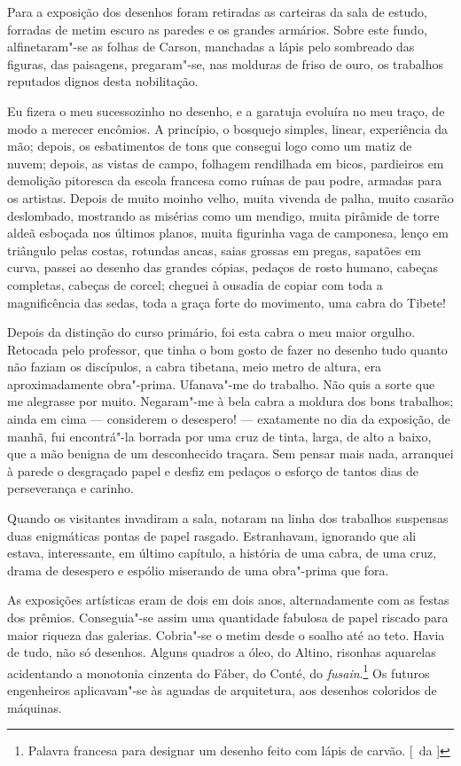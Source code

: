 Para a exposição dos desenhos foram retiradas as carteiras da sala de
estudo, forradas de metim escuro as paredes e os grandes armários.
Sobre este fundo, alfinetaram"-se as folhas de Carson, manchadas a
lápis pelo sombreado das figuras, das paisagens, pregaram"-se, nas
molduras de friso de ouro, os trabalhos reputados dignos desta
nobilitação. 

Eu fizera o meu sucessozinho no desenho, e a garatuja
evoluíra no meu traço, de modo a merecer encômios. A princípio, o
bosquejo simples, linear, experiência da mão; depois, os esbatimentos
de tons que consegui logo como um matiz de nuvem; depois, as vistas de
campo, folhagem rendilhada em bicos, pardieiros em demolição pitoresca
da escola francesa como ruínas de pau podre, armadas
para os artistas. Depois de muito moinho velho, muita vivenda de palha,
muito casarão deslombado, mostrando as misérias como um mendigo, muita
pirâmide de torre aldeã esboçada nos últimos planos, muita figurinha
vaga de camponesa, lenço em triângulo pelas costas, rotundas ancas,
saias grossas em pregas, sapatões em curva, passei ao desenho das
grandes cópias, pedaços de rosto humano, cabeças completas, cabeças de
corcel; cheguei à ousadia de copiar com toda a magnificência das sedas,
toda a graça forte do movimento, uma cabra do Tibete! 

Depois da distinção do curso primário, foi esta cabra o meu maior orgulho.
Retocada pelo professor, que tinha o bom gosto de fazer no desenho tudo
quanto não faziam os discípulos, a cabra tibetana, meio metro de
altura, era aproximadamente obra"-prima. Ufanava"-me do trabalho. Não
quis a sorte que me alegrasse por muito. Negaram"-me à bela cabra a
moldura dos bons trabalhos; ainda em cima --- considerem o desespero!
--- exatamente no dia da exposição, de manhã, fui encontrá"-la borrada
por uma cruz de tinta, larga, de alto a baixo, que a mão benigna de um
desconhecido traçara. Sem pensar mais nada, arranquei à parede o
desgraçado papel e desfiz em pedaços o esforço de tantos dias de
perseverança e carinho. 

Quando os visitantes invadiram a sala, notaram
na linha dos trabalhos suspensas duas enigmáticas pontas de papel
rasgado. Estranhavam, ignorando que ali estava, interessante, em último
capítulo, a história de uma cabra, de uma cruz, drama de desespero e
espólio miserando de uma obra"-prima que fora. 

As exposições
artísticas eram de dois em dois anos, alternadamente com as festas dos
prêmios. Conseguia"-se assim uma quantidade fabulosa de papel riscado
para maior riqueza das galerias. Cobria"-se o metim desde o soalho até
ao teto. Havia de tudo, não só desenhos. Alguns quadros a óleo, do
Altino, risonhas aquarelas acidentando a monotonia cinzenta do Fáber,
do Conté, do \textit{fusain}.\footnote{ Palavra francesa para designar um desenho 
feito com lápis de carvão. [~da ]} Os futuros engenheiros aplicavam"-se às aguadas de
arquitetura, aos desenhos coloridos de máquinas. 

